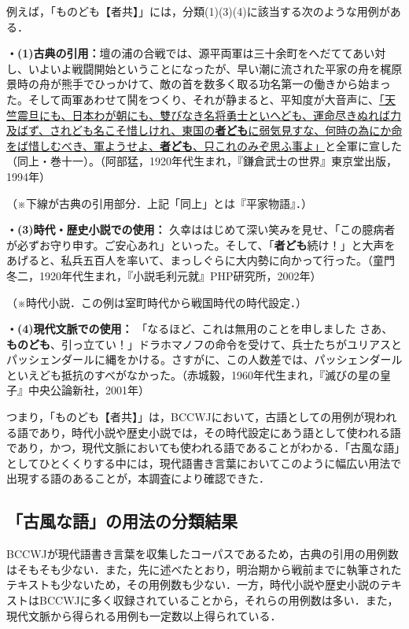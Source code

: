 \documentclass[japanese]{jnlp_1.4}
\begin{document}
例えば，「ものども【者共】」には，分類(1)(3)(4)に該当する次のような用例がある．

{\setlength{\leftskip}{1zw}\setlength{\parindent}{0pt}
\textbf{・(1)古典の引用：}壇の浦の合戦では、源平両軍は三十余町をへだててあい対し、いよいよ戦闘開始ということになったが、早い潮に流された平家の舟を梶原景時の舟が熊手でひっかけて、敵の首を数多く取る功名第一の働きから始まった。そして両軍あわせて鬨をつくり、それが静まると、平知度が大音声に、\ul{「天竺震旦にも、日本わが朝にも、雙びなき名将勇士といへども、運命尽きぬれば力及ばず、されども名こそ惜しけれ、東国の{\bfseries 者ども}に弱気見すな、何時の為にか命をば惜しむべき、軍ようせよ、{\bfseries 者ども}、只これのみぞ思ふ事よ」}と全軍に宣した（同上・巻十一）。（阿部猛，1920年代生まれ，『鎌倉武士の世界』東京堂出版，1994年）

（※下線が古典の引用部分．上記「同上」とは『平家物語』．）

\textbf{・(3)時代・歴史小説での使用： 
}久幸ははじめて深い笑みを見せ、「この臆病者が必ずお守り申す。ご安心あれ」といった。そして、「\textbf{者ども}続け！」と大声をあげると、私兵五百人を率いて、まっしぐらに大内勢に向かって行った。（童門冬二，1920年代生まれ，『小説毛利元就』PHP研究所，2002年）

（※時代小説．この例は室町時代から戦国時代の時代設定．）

\textbf{・(4)現代文脈での使用： 
}「なるほど、これは無用のことを申しました\textellipsis 
さあ、\textbf{ものども}、引っ立てい！」ドラホマノフの命令を受けて、兵士たちがユリアスとパッシェンダールに縄をかける。さすがに、この人数差では、パッシェンダールといえども抵抗のすべがなかった。（赤城毅，1960年代生まれ，『滅びの星の皇子』中央公論新社，2001年）
\par}

つまり，「ものども【者共】」は，BCCWJにおいて，古語としての用例が現われる語であり，時代小説や歴史小説では，その時代設定にあう語として使われる語であり，かつ，現代文脈においても使われる語であることがわかる．「古風な語」としてひとくくりする中には，現代語書き言葉においてこのように幅広い用法で出現する語のあることが，本調査により確認できた．


\subsection{「古風な語」の用法の分類結果}

BCCWJが現代語書き言葉を収集したコーパスであるため，古典の引用の用例数はそもそも少ない．また，先に述べたとおり，明治期から戦前までに執筆されたテキストも少ないため，その用例数も少ない．一方，時代小説や歴史小説のテキストはBCCWJに多く収録されていることから，それらの用例数は多い．また，現代文脈から得られる用例も一定数以上得られている．
\end{document}
